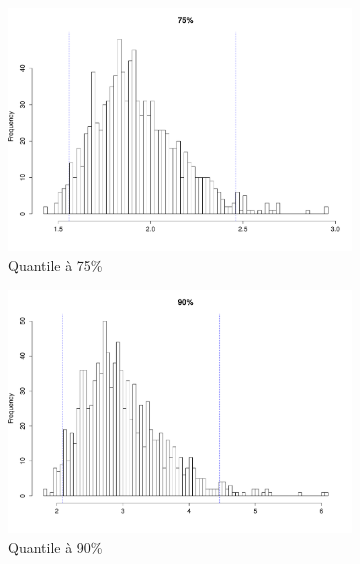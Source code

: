 \documentclass{article}
\renewcommand*{\(}{ \left( }
\renewcommand*{\)}{ \right) }
\begin{document}
\begin{figure}[H]
    \centering
    \begin{subfigure}[t]{0.3\textwidth}
        \includegraphics[width = \linewidth]{img/BootstrapAEMV-75-30.pdf}
        \caption{Quantile à 75\%}
        \label{fig:BAEMV75} %
    \end{subfigure}%
    \begin{subfigure}[t]{0.3\textwidth}
        \includegraphics[width = \linewidth]{img/BootstrapAEMV-90-30.pdf}
        \caption{Quantile à 90\%}
        \label{fig:BAEMV90}
    \end{subfigure}%
    \begin{subfigure}[t]{0.3\textwidth}

\end{subfigure}
\end{figure}
\end{document}
